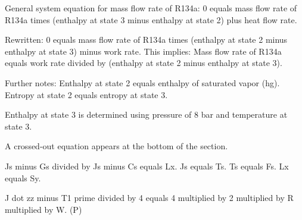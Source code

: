 General system equation for mass flow rate of R134a:  
0 equals mass flow rate of R134a times (enthalpy at state 3 minus enthalpy at state 2) plus heat flow rate.  

Rewritten:  
0 equals mass flow rate of R134a times (enthalpy at state 2 minus enthalpy at state 3) minus work rate.  
This implies:  
Mass flow rate of R134a equals work rate divided by (enthalpy at state 2 minus enthalpy at state 3).  

Further notes:  
Enthalpy at state 2 equals enthalpy of saturated vapor (hg).  
Entropy at state 2 equals entropy at state 3.  

Enthalpy at state 3 is determined using pressure of 8 bar and temperature at state 3.  

A crossed-out equation appears at the bottom of the section.

Js minus Gs divided by Js minus Cs equals Lx.  
Js equals Ts.  
Ts equals Fs.  
Lx equals Sy.  

J dot zz minus T1 prime divided by 4 equals 4 multiplied by 2 multiplied by R multiplied by W. (P)